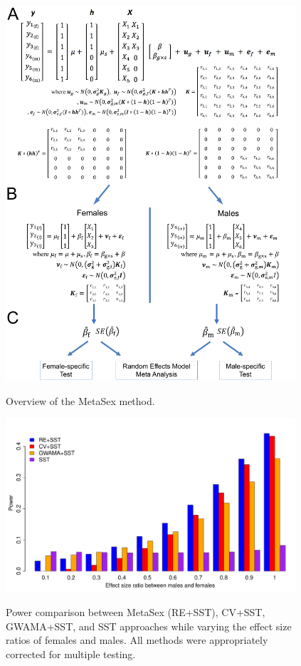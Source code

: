 \documentclass[11pt]{article}
\begin{document}
\begin{figure}[p]
  \centering
  {\includegraphics[width=0.96\textwidth]{../Figures/Fig1/Fig1_A4.pdf}}
  \caption{Overview of the MetaSex method.}
  \label{overview}
\end{figure}

\begin{figure}[h]
\centering
{\includegraphics[width=0.96\textwidth]{../Figures/Fig2/power19_3_cv_CHL.pdf}}
\caption{ Power comparison between MetaSex (RE+SST), CV+SST, GWAMA+SST, 
and SST approaches while varying 
the effect size ratios of females and males. 
All methods were appropriately corrected for multiple testing.
}
\label{power_four}
\end{figure}
\end{document}
